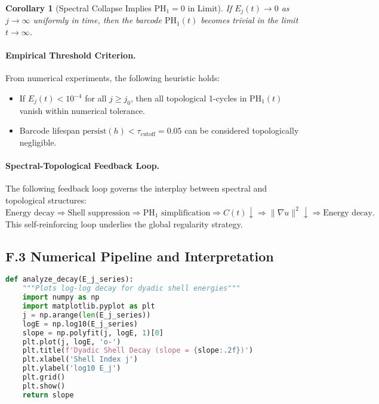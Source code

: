 \documentclass[11pt]{article}
\newtheorem{corollary}[theorem]{Corollary}
\theoremstyle{definition}
\begin{document}
\begin{corollary}[Spectral Collapse Implies \( \mathrm{PH}_1 = 0 \) in Limit]
If \( E_j(t) \to 0 \) as \( j \to \infty \) uniformly in time, then the barcode \( \mathrm{PH}_1(t) \) becomes trivial in the limit
\( t \to \infty \).
\end{corollary}

\paragraph{Empirical Threshold Criterion.} From numerical experiments, the following heuristic holds:
\begin{itemize}
  \item If \( E_j(t) < 10^{-4} \) for all \( j \geq j_0 \), then all topological 1-cycles in \( \mathrm{PH}_1(t) \) vanish within numerical tolerance.
  \item Barcode lifespan \( \text{persist}(h) < \tau_{\text{cutoff}} = 0.05 \) can be considered topologically negligible.
\end{itemize}

\paragraph{Spectral-Topological Feedback Loop.} The following feedback loop governs the interplay between spectral and topological structures:
\[ 
\text{Energy decay} \Rightarrow \text{Shell suppression} \Rightarrow \mathrm{PH}_1 \text{ simplification} \Rightarrow C(t) \downarrow \Rightarrow \|\nabla u\|^2 \downarrow \Rightarrow \text{Energy decay}.
\]
This self-reinforcing loop underlies the global regularity strategy.

\subsection*{F.3 Numerical Pipeline and Interpretation}

\begin{lstlisting}[language=Python]
def analyze_decay(E_j_series):
    """Plots log-log decay for dyadic shell energies"""
    import numpy as np
    import matplotlib.pyplot as plt
    j = np.arange(len(E_j_series))
    logE = np.log10(E_j_series)
    slope = np.polyfit(j, logE, 1)[0]
    plt.plot(j, logE, 'o-')
    plt.title(f'Dyadic Shell Decay (slope = {slope:.2f})')
    plt.xlabel('Shell Index j')
    plt.ylabel('log10 E_j')
    plt.grid()
    plt.show()
    return slope
\end{lstlisting}
\end{document}
